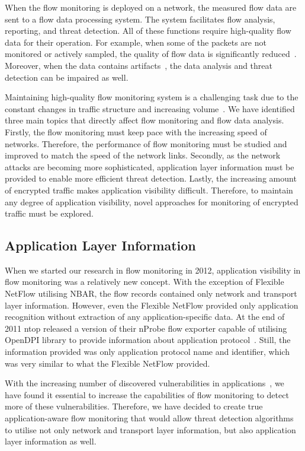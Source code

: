 When the flow monitoring is deployed on a network, the measured flow data are sent to a flow data processing system. The system facilitates flow analysis, reporting, and threat detection. All of these functions require high-quality flow data for their operation. For example, when some of the packets are not monitored or actively sampled, the quality of flow data is significantly reduced~\cite{Brauckhoff-2006-Impact}. Moreover, when the data contains artifacts~\cite{Hofstede-2013-Measurement}, the data analysis and threat detection can be impaired as well.

Maintaining high-quality flow monitoring system is a challenging task due to the constant changes in traffic structure and increasing volume~\cite{CiscoSystems-2017-Cisco}. We have identified three main topics that directly affect flow monitoring and flow data analysis. Firstly, the flow monitoring must keep pace with the increasing speed of networks. Therefore, the performance of flow monitoring must be studied and improved to match the speed of the network links. Secondly, as the network attacks are becoming more sophisticated, application layer information must be provided to enable more efficient threat detection. Lastly, the increasing amount of encrypted traffic makes application visibility difficult. Therefore, to maintain any degree of application visibility, novel approaches for monitoring of encrypted traffic must be explored. 

\subsection{Application Layer Information}

When we started our research in flow monitoring in 2012, application visibility in flow monitoring was a relatively new concept. With the exception of Flexible NetFlow utilising NBAR, the flow records contained only network and transport layer information. However, even the Flexible NetFlow provided only application recognition without extraction of any application-specific data. At the end of 2011 ntop released a version of their nProbe flow exporter capable of utilising OpenDPI library to provide information about application protocol~\cite{ntop-2011-Unveiling}. Still, the information provided was only application protocol name and identifier, which was very similar to what the Flexible NetFlow provided.

With the increasing number of discovered vulnerabilities in applications~\cite{Younan-2013-25}, we have found it essential to increase the capabilities of flow monitoring to detect more of these vulnerabilities. Therefore, we have decided to create true application-aware flow monitoring that would allow threat detection algorithms to utilise not only network and transport layer information, but also application layer information as well.

